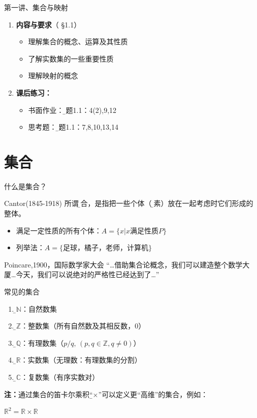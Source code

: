 
\begin{frame}{第一讲、集合与映射}
	\linespread{1.5}
	\begin{enumerate}
	  \item {\bf 内容与要求}{\color{blue}（ \S1.1）}
	  \begin{itemize}
	    \item 理解集合的概念、运算及其性质
	    \item 了解实数集的一些重要性质
	    \item 理解映射的概念
	  \vspace{1em}
	  \end{itemize}
	  \item {\bf 课后练习：}
	  \begin{itemize}
	    \item 书面作业：{\b 习题1.1：4(2),9,12}
	    \item 思考题：{\b 习题1.1：7,8,10,13,14}
	  \end{itemize}
	\end{enumerate}
\end{frame}

\section{集合}

\begin{frame}{什么是集合？}
	\linespread{1.2}\pause 
	\begin{block}{Cantor(1845-1918)}
		所谓{\b 集合}，是指把一些个体（{\b 元素}）\pause 放在一起考虑时它们形成的整体。
	\end{block}\pause 
	\begin{itemize}
	  \item 满足一定性质的所有个体\pause ：$A=\{x|x$满足性质$P\}$\pause 
	  \item 列举法\pause ：$A=\{$足球，橘子，老师，计算机$\}$
	\end{itemize}\pause 
	\begin{block}{Poincare,1900，国际数学家大会}\pause 
		 \alert{“\ldots 借助集合论概念，我们可以建造整个数学大厦\ldots \pause 今天，我们可以说绝对的严格性已经达到了\ldots”}
	\end{block}
\end{frame}

\begin{frame}{常见的集合}
	\linespread{1.4}\pause 
	\begin{enumerate}
	  \item {\b$\mathbb{N}$}：自然数集\pause 
	  \item {\b$\mathbb{Z}$}：整数集（所有自然数及其相反数，$0$）\pause 
	  \item {\b$\mathbb{Q}$}：有理数集（$p/q,\,(p,q\in\mathbb{Z},q\ne 0)$）\pause 
	  \item {\b$\mathbb{R}$}：\alert{实数集}（无理数：有理数集的分割）\pause 
	  \item {\b$\mathbb{C}$}：复数集（有序实数对）\pause 
	\end{enumerate}
	\linespread{1.2}
	{\bf 注：}通过集合的笛卡尔乘积{\b “$\times$”}\pause 可以定义更\alert{“高维”}的集合，\pause 例如：\\
	\centerline{$\mathbb{R}^2=\mathbb{R}\times\mathbb{R}$}
\end{frame}

